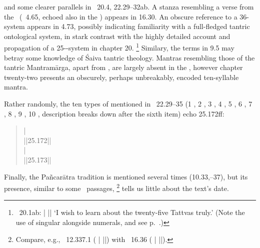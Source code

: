 and some clearer parallels in \VSS\ 20.4, 22.29--32ab.
A stanza resembling a verse from the \NisvMukha\ (\NISVMUKHA\ 4.65, echoed also in the ) appears in 16.30.
An obscure reference to a 36- system appears in 4.73, possibly indicating familiarity with a full-fledged tantric ontological system, in stark contrast with the highly detailed account and propagation of a 25--system in chapter 20.%
			\footnote{\VSS\ 20.1ab: 
			 |
			 ||
        `I wish to learn about the twenty-five 
        Tattvas truly.' (Note the use of singular alongside
        numerals, and see
        p.~\pageref{singularwithnumerals}.) }
Similary, the terms  in 9.5 may betray some knowledge of Śaiva tantric theology. Mantras resembling those of the tantric Mantra\-mārga, apart from , are largely absent in the \VSS, however chapter twenty-two presents an obscurely, perhaps unbreakably, encoded ten-syllable mantra.

Rather randomly, the ten types of  mentioned in \VSS\ 22.29--35
(1 , 2 , 3 , 4 , 5 ,
6 , 7 , 8 , 9 , 10 ,
description breaks down after the sixth item) echo  25.172ff:

\begin{quote}
 |\\
 ||25.172||\\
 |\\
 ||25.173||\\
\end{quote}



\noindent
Finally, the Pañcarātra tradition is mentioned several times (10.33,--37), but its presence, similar to some \MBH\ passages,%
			\footnote{Compare, e.g., \MBH\ 12.337.1
			( |
		     ||) with
		    \VSS\ 16.36 
		    ( |
			 ||).} 
tells us little about the text's date.						

